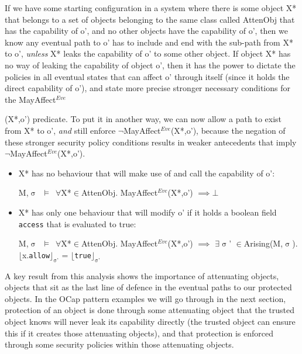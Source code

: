\documentclass[a4paper,11pt, twoside,twocolumn]{article}
\newenvironment{logic}[1][]
{\begin{flushleft} \small }
{\end{flushleft}}
\newcommand{\loin}{$\in$}
\newcommand{\loforall}{$\forall$}
\newcommand{\loexists}{$\exists$}
\newcommand{\loimplies}{$\implies$}
\newcommand{\losigma}{$\upsigma$}
\newcommand{\loturns} {$\vDash$}
\newcommand{\loneg}{$\boldsymbol \neg$}
\newcommand{\loexec}[2] {$\lfloor$#1$\rfloor _{\text{#2}}$}
\newcommand{\ablock} {\null\qquad}
\begin{document}
If we have some starting configuration in a system where there is some object X* that belongs to a set of objects belonging to the same class called AttenObj that has the capability of o', and no other objects have the capability of o', then we know any eventual path to o' has to include and end with the sub-path from X* to o', \textit{unless} X* leaks the capability of o' to some other object. If object X* has no way of leaking the capability of object o', then it has the power to dictate the policies in all eventual states that can affect o' through itself (since it holds the direct capability of o'), and state more precise stronger necessary conditions for the MayAffect$^{Eve}${(X*,o') predicate. To put it in another way, we can now allow a path to exist from X* to o', \textit{and} still enforce \loneg MayAffect$^{Eve}$(X*,o'), because the negation of these stronger security policy conditions results in weaker antecedents that imply \loneg MayAffect$^{Eve}$(X*,o').
\begin{itemize}
\item X* has no behaviour that will make use of and call the capability of o':
\begin{logic} M,\losigma\ \loturns\ \loforall X*\loin AttenObj. MayAffect$^{Eve}$(X*,o')\linebreak
\ablock \loimplies $\bot$\end{logic}
\item X* has only one behaviour that will modify o' if it holds a boolean field \texttt{access} that is evaluated to true:
\begin{logic} M,\losigma\ \loturns\ \loforall X*\loin AttenObj. MayAffect$^{Eve}$(X*,o')\linebreak
\ablock \loimplies\linebreak 
\ablock \loexists \losigma' \loin Arising(M,\losigma).\linebreak
\ablock \ablock \loexec{x.\texttt{allow}}{\losigma'} = \loexec{\texttt{true}}{\losigma'} \end{logic}
\end{itemize}
A key result from this analysis shows the importance of attenuating objects, objects that sit as the last line of defence in the eventual paths to our protected objects. In the OCap pattern examples we will go through in the next section, protection of an object is done through some attenuating object that the trusted object knows will never leak its capability directly (the trusted object can ensure this if it creates those attenuating objects), and that protection is enforced through some security policies within those attenuating objects.\\\

}
\end{document}
